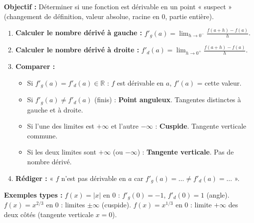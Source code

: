 \documentclass[11pt]{article}
\begin{document}
\begin{methode}
\textbf{Objectif :} Déterminer si une fonction est dérivable en un point « suspect » (changement de définition, valeur absolue, racine en 0, partie entière).
\begin{enumerate}
    \item \textbf{Calculer le nombre dérivé à gauche :} $f'_g(a) = \lim_{h \to 0^-} \frac{f(a+h)-f(a)}{h}$.
    \item \textbf{Calculer le nombre dérivé à droite :} $f'_d(a) = \lim_{h \to 0^+} \frac{f(a+h)-f(a)}{h}$.
    \item \textbf{Comparer :}
        \begin{itemize}
            \item Si $f'_g(a) = f'_d(a) \in \mathbb{R}$ : $f$ est dérivable en $a$, $f'(a)$ = cette valeur.
            \item Si $f'_g(a) \neq f'_d(a)$ (finis) : \textbf{Point anguleux}. Tangentes distinctes à gauche et à droite.
            \item Si l'une des limites est $+\infty$ et l'autre $-\infty$ : \textbf{Cuspide}. Tangente verticale commune.
            \item Si les deux limites sont $+\infty$ (ou $-\infty$) : \textbf{Tangente verticale}. Pas de nombre dérivé.
        \end{itemize}
    \item \textbf{Rédiger :} « $f$ n'est pas dérivable en $a$ car $f'_g(a) = \dots \neq f'_d(a) = \dots$ ».
\end{enumerate}
\textbf{Exemples types :} $f(x)=|x|$ en $0$ : $f'_g(0)=-1$, $f'_d(0)=1$ (angle). $f(x)=x^{2/3}$ en $0$ : limites $\pm\infty$ (cuspide). $f(x)=x^{1/3}$ en $0$ : limite $+\infty$ des deux côtés (tangente verticale $x=0$).
\end{methode}
\end{document}
